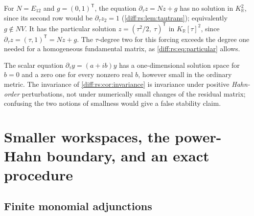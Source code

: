 \documentclass[11pt,letterpaper]{article}
\numberwithin{equation}{section}
\theoremstyle{definition}
\theoremstyle{remark}
\newcommand{\R}{\mathbb R}
\newcommand{\der}{\partial}
\newcommand{\derT}{\der_{\tau}}
\newcommand{\KR}{K_{\R}}
\begin{document}
\begin{example}
\label{diff:rs:ex:forced}
For $N=E_{12}$ and $g=(0,1)^{\mathsf T}$, the equation $\derT z=Nz+g$ has no
solution in $\KR^{2}$, since its second row would be $\derT z_{2}=1$
(\cref{diff:rs:lem:tautrans}); equivalently $g\notin NV$. It has the particular
solution $z=(\tau^{2}/2,\ \tau)^{\mathsf T}$ in $\KR[\tau]^{2}$, since
$\derT z=(\tau,1)^{\mathsf T}=Nz+g$. The $\tau$-degree two for this forcing exceeds
the degree one needed for a homogeneous fundamental matrix, as
\cref{diff:rs:eq:particular} allows.
\end{example}

\begin{example}
\label{diff:rs:ex:discontinuity}
The scalar equation $\derT y=(a+ib)y$ has a one-dimensional solution space for
$b=0$ and a zero one for every nonzero real $b$, however small in the ordinary
metric. The invariance of \cref{diff:rs:cor:invariance} is invariance under
positive \emph{Hahn-order} perturbations, not under numerically small changes of
the residual matrix; confusing the two notions of smallness would give a false
stability claim.
\end{example}

\section{Smaller workspaces, the power-Hahn boundary, and an exact procedure}
\label{diff:rs:sec:workspaces}

\subsection{Finite monomial adjunctions}
\label{diff:rs:sub:workspace}
\end{document}
